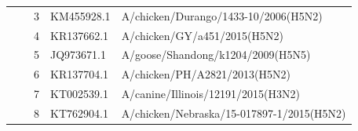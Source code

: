 \begin{table}[t]
\begin{tabular}{cclll}
 &  & 3 & KM455928.1 & A/chicken/Durango/1433-10/2006(H5N2) \\
 &  & 4 & KR137662.1 & A/chicken/GY/a451/2015(H5N2) \\
 &  & 5 & JQ973671.1 & A/goose/Shandong/k1204/2009(H5N5) \\
 &  & 6 & KR137704.1 & A/chicken/PH/A2821/2013(H5N2) \\
 &  & 7 & KT002539.1 & A/canine/Illinois/12191/2015(H3N2) \\
 &  & 8 & KT762904.1 & A/chicken/Nebraska/15-017897-1/2015(H5N2) \\
\bottomrule
\end{tabular}
\end{table}
